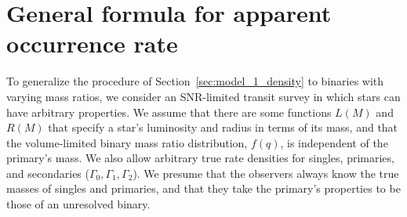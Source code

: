 \documentclass[12pt,modern]{aastex61}
\begin{document}
\section{General formula for apparent occurrence rate}
\label{sec:general_formula}

To generalize the procedure of Section~\ref{sec:model_1_density} to binaries
with varying mass ratios, we consider an SNR-limited transit survey in which
stars can have arbitrary properties.  We assume that there are some functions
$L(M)$ and $R(M)$ that specify a star's luminosity and radius in terms of its
mass, and that the volume-limited binary mass ratio distribution, $f(q)$, is
independent of the primary's mass.  We also allow arbitrary true rate densities
for singles, primaries, and secondaries ($\Gamma_0, \Gamma_1, \Gamma_2$).  We
presume that the observers always know the true masses of singles and
primaries, and that they take the primary's properties to be those of an
unresolved binary.
\end{document}
